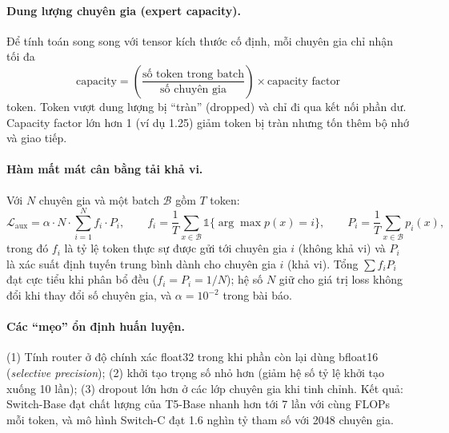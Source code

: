 \paragraph{Dung lượng chuyên gia (expert capacity).} Để tính toán song song với tensor kích thước cố định, mỗi chuyên gia chỉ nhận tối đa
\[
\text{capacity} = \left(\frac{\text{số token trong batch}}{\text{số chuyên gia}}\right) \times \text{capacity factor}
\]
token. Token vượt dung lượng bị “tràn” (dropped) và chỉ đi qua kết nối phần dư. Capacity factor lớn hơn 1 (ví dụ 1.25) giảm token bị tràn nhưng tốn thêm bộ nhớ và giao tiếp.

\paragraph{Hàm mất mát cân bằng tải khả vi.} Với $N$ chuyên gia và một batch $\mathcal{B}$ gồm $T$ token:
\[
\mathcal{L}_{\text{aux}} = \alpha \cdot N \cdot \sum_{i=1}^{N} f_i \cdot P_i,
\qquad
f_i = \frac{1}{T}\sum_{x\in\mathcal{B}} \mathbb{1}\{\arg\max p(x) = i\},
\qquad
P_i = \frac{1}{T}\sum_{x\in\mathcal{B}} p_i(x),
\]
trong đó $f_i$ là tỷ lệ token thực sự được gửi tới chuyên gia $i$ (không khả vi) và $P_i$ là xác suất định tuyến trung bình dành cho chuyên gia $i$ (khả vi). Tổng $\sum f_i P_i$ đạt cực tiểu khi phân bổ đều ($f_i = P_i = 1/N$); hệ số $N$ giữ cho giá trị loss không đổi khi thay đổi số chuyên gia, và $\alpha = 10^{-2}$ trong bài báo.

\paragraph{Các “mẹo” ổn định huấn luyện.} (1) Tính router ở độ chính xác float32 trong khi phần còn lại dùng bfloat16 (\emph{selective precision}); (2) khởi tạo trọng số nhỏ hơn (giảm hệ số tỷ lệ khởi tạo xuống 10 lần); (3) dropout lớn hơn ở các lớp chuyên gia khi tinh chỉnh. Kết quả: Switch-Base đạt chất lượng của T5-Base nhanh hơn tới 7 lần với cùng FLOPs mỗi token, và mô hình Switch-C đạt 1.6 nghìn tỷ tham số với 2048 chuyên gia.

